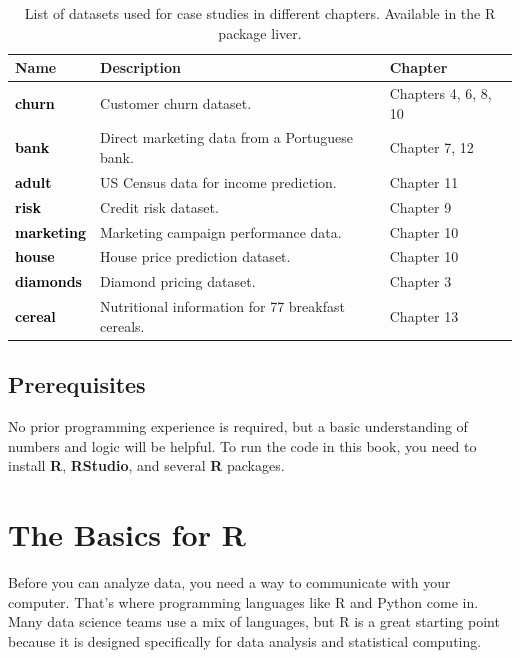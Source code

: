 \documentclass[
]{book}
\theoremstyle{definition}
\theoremstyle{definition}
\theoremstyle{definition}
\theoremstyle{definition}
\theoremstyle{remark}
\begin{document}
\begin{table}
\centering
\caption{\label{tab:data-table}List of datasets used for case studies in different chapters. Available in the R package liver.}
\centering
\begin{tabular}[t]{>{}l>{\raggedright\arraybackslash}p{20em}l}
\toprule
Name & Description & Chapter\\
\midrule
\textcolor{black}{\textbf{churn}} & Customer churn dataset. & Chapters 4, 6, 8, 10\\
\textcolor{black}{\textbf{bank}} & Direct marketing data from a Portuguese bank. & Chapter 7, 12\\
\textcolor{black}{\textbf{adult}} & US Census data for income prediction. & Chapter 11\\
\textcolor{black}{\textbf{risk}} & Credit risk dataset. & Chapter 9\\
\textcolor{black}{\textbf{marketing}} & Marketing campaign performance data. & Chapter 10\\
\addlinespace
\textcolor{black}{\textbf{house}} & House price prediction dataset. & Chapter 10\\
\textcolor{black}{\textbf{diamonds}} & Diamond pricing dataset. & Chapter 3\\
\textcolor{black}{\textbf{cereal}} & Nutritional information for 77 breakfast cereals. & Chapter 13\\
\bottomrule
\end{tabular}
\end{table}

\section*{Prerequisites}\label{prerequisites}

No prior programming experience is required, but a basic understanding of numbers and logic will be helpful. To run the code in this book, you need to install \textbf{R}, \textbf{RStudio}, and several \textbf{R} packages.

\chapter{The Basics for R}\label{chapter-into-R}

Before you can analyze data, you need a way to communicate with your computer. That's where programming languages like R and Python come in. Many data science teams use a mix of languages, but R is a great starting point because it is designed specifically for data analysis and statistical computing.
\end{document}
